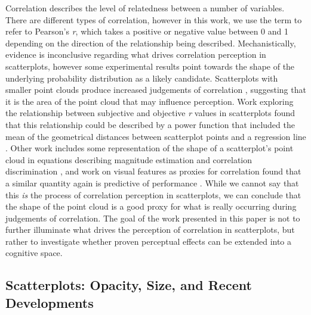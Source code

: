 \documentclass[manuscript,screen,review,anonymous]{acmart}
\begin{document}
Correlation describes the level of relatedness between a number of
variables. There are different types of correlation, however in this
work, we use the term to refer to Pearson's \emph{r}, which takes a
positive or negative value between 0 and 1 depending on the direction of
the relationship being described. Mechanistically, evidence is
inconclusive regarding what drives correlation perception in
scatterplots, however some experimental results point towards the shape
of the underlying probability distribution as a likely candidate.
Scatterplots with smaller point clouds produce increased judgements of
correlation \citep{cleveland_1982}, suggesting that it is the area of
the point cloud that may influence perception. Work exploring the
relationship between subjective and objective \emph{r} values in
scatterplots found that this relationship could be described by a power
function that included the mean of the geometrical distances between
scatterplot points and a regression line \citep{meyer_1997}. Other work
includes some representation of the shape of a scatterplot's point cloud
in equations describing magnitude estimation and correlation
discrimination \citep{meyer_1997, rensink_2017}, and work on visual
features as proxies for correlation found that a similar quantity again
is predictive of performance \citep{yang_2019}. While we cannot say that
this \emph{is} the process of correlation perception in scatterplots, we
can conclude that the shape of the point cloud is a good proxy for what
is really occurring during judgements of correlation. The goal of the
work presented in this paper is not to further illuminate what drives
the perception of correlation in scatterplots, but rather to investigate
whether proven perceptual effects can be extended into a cognitive
space.

\subsection{Scatterplots: Opacity, Size, and Recent
Developments}\label{sec-scatterplots}
\end{document}

